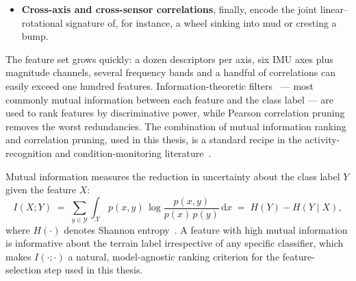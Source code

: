 \begin{itemize}
    Letting $\hat{X}(f)$ denote the discrete Fourier transform of the windowed signal and $S_{xx}(f) = |\hat{X}(f)|^{2}/N$ its periodogram estimate of the one-sided power spectral density~\cite{Welch1967}, the power in a band $[f_{\mathrm{lo}},\,f_{\mathrm{hi}}]$ is
    \begin{equation}
        P_{[f_{\mathrm{lo}},\,f_{\mathrm{hi}}]}(x)
          \;=\; \int_{f_{\mathrm{lo}}}^{f_{\mathrm{hi}}} S_{xx}(f)\,\mathrm{d}f.
        \label{eq:band-power}
    \end{equation}
    The spectral centroid $f_{\mathrm{c}}$ and the (normalised) spectral entropy $H_{\mathrm{s}}$ are computed from the same periodogram as
    \begin{equation}
        f_{\mathrm{c}}(x) = \frac{\sum_{f>0} f\, S_{xx}(f)}{\sum_{f>0} S_{xx}(f)},
        \qquad
        H_{\mathrm{s}}(x) = -\sum_{f>0} p(f)\log_{2} p(f),
        \quad p(f) = \frac{S_{xx}(f)}{\sum_{f'>0} S_{xx}(f')}.
        \label{eq:spectral}
    \end{equation}
    Jerk RMS, finally, captures the rate of change of acceleration; for a sampling period $T_{s}$ it is computed as
    \begin{equation}
        \mathrm{JerkRMS}(x)
          \;=\; \sqrt{\,\frac{1}{N-1}\sum_{n=1}^{N-1}\!\left(\frac{x[n]-x[n-1]}{T_{s}}\right)^{2}}.
        \label{eq:jerk-rms}
    \end{equation}

    \item \textbf{Cross-axis and cross-sensor correlations}, finally, encode the joint linear--rotational signature of, for instance, a wheel sinking into mud or cresting a bump.

\end{itemize}

The feature set grows quickly: a dozen descriptors per axis, six IMU axes plus magnitude channels, several frequency bands and a handful of correlations can easily exceed one hundred features. Information-theoretic filters~\cite{Vergara2014,Cover2006} --- most commonly mutual information between each feature and the class label --- are used to rank features by discriminative power, while Pearson correlation pruning removes the worst redundancies. The combination of mutual information ranking and correlation pruning, used in this thesis, is a standard recipe in the activity-recognition and condition-monitoring literature~\cite{Bao2004,Vergara2014}.

Mutual information measures the reduction in uncertainty about the class label $Y$ given the feature $X$:
\begin{equation}
    I(X;Y) \;=\; \sum_{y \in \mathcal{Y}} \int_{\mathcal{X}}
                p(x,y)\,\log\!\frac{p(x,y)}{p(x)\,p(y)}\,\mathrm{d}x
          \;=\; H(Y) - H(Y \mid X),
    \label{eq:mi}
\end{equation}
where $H(\cdot)$ denotes Shannon entropy~\cite{Cover2006}. A feature with high mutual information is informative about the terrain label irrespective of any specific classifier, which makes $I(\cdot;\cdot)$ a natural, model-agnostic ranking criterion for the feature-selection step used in this thesis.


